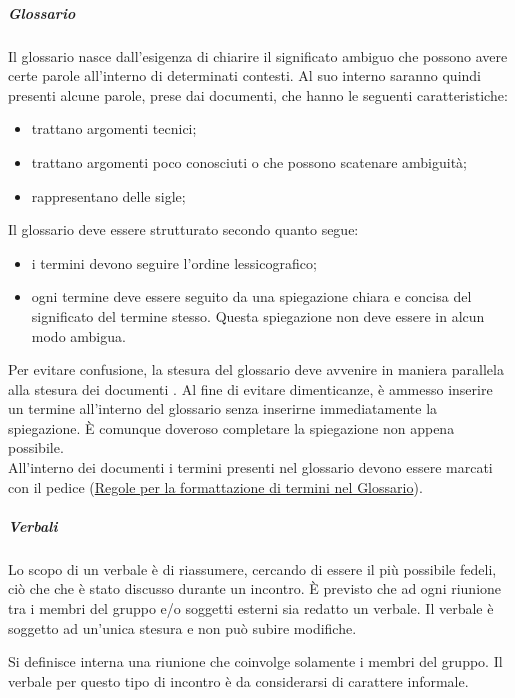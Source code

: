\documentclass[../NormeProgetto.tex]{subfiles}
\begin{document}
		\subparagraph{Glossario} \label{sec:Glossario}
		Il glossario nasce dall'esigenza di chiarire il significato ambiguo che possono avere certe parole all'interno di determinati contesti. Al suo interno saranno quindi presenti alcune parole, prese dai documenti, che hanno le seguenti caratteristiche:
		\begin{itemize}
			\item trattano argomenti tecnici;
			\item trattano argomenti poco conosciuti o che possono scatenare ambiguità;
			\item rappresentano delle sigle;
		\end{itemize}
		Il glossario deve essere strutturato secondo quanto segue:
		\begin{itemize}
			\item i termini devono seguire l'ordine lessicografico;
			\item ogni termine deve essere seguito da una spiegazione chiara e concisa del significato del termine stesso. Questa spiegazione non deve essere in alcun modo ambigua.
		\end{itemize}
		Per evitare confusione, la stesura del glossario deve avvenire in maniera parallela alla stesura dei documenti . Al fine di evitare dimenticanze, è ammesso inserire un termine all'interno del glossario senza inserirne immediatamente la spiegazione. È comunque doveroso completare la spiegazione non appena possibile. \\ All'interno dei documenti i termini presenti nel glossario devono essere marcati con il pedice \g (\hyperref[sec:Formattazione termini nel glossario]{Regole per la formattazione di termini nel Glossario}).
		
		\subparagraph{Verbali}
		Lo scopo di un verbale è di riassumere, cercando di essere il più possibile fedeli, ciò che che è stato discusso durante un incontro. È previsto che ad ogni riunione tra i membri del gruppo e/o soggetti esterni sia redatto un verbale. Il verbale è soggetto ad un'unica stesura e non può subire modifiche.
			
			Si definisce interna una riunione che coinvolge solamente i membri del gruppo. Il verbale per questo tipo di incontro è da considerarsi di carattere informale. 
			
\end{document}
